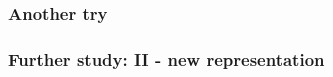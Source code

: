 \documentclass[aspectratio=169]{beamer}
\begin{document}
\begin{frame}
    \frametitle{Another try}
\end{frame}

\begin{frame}
    \frametitle{Further study: II - new representation}
    \begin{figure}[ht]\centering
    \end{figure}
\end{frame}
\end{document}
